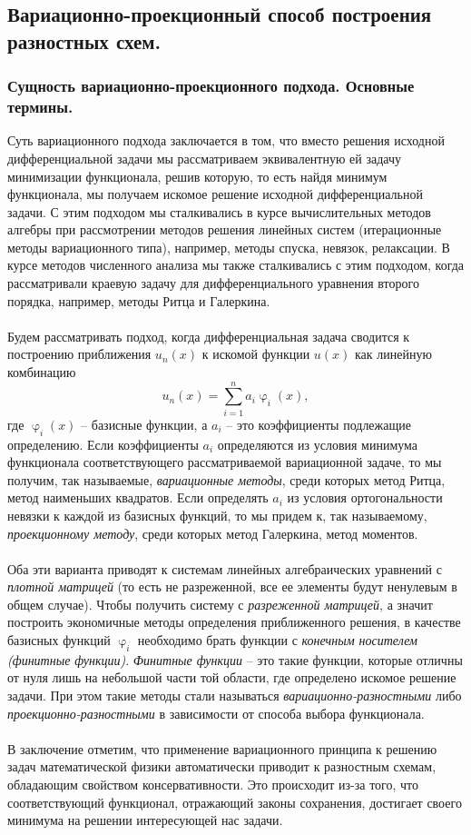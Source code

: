 \documentclass[a4paper, 12pt]{report}
\numberwithin{equation}{section}
\renewcommand{\varphi}{\upvarphi}
\begin{document}
	\subsection{Вариационно-проекционный способ построения разностных схем.}
	\subsubsection{Сущность вариационно-проекционного подхода. Основные термины.}
	Суть вариационного подхода заключается в том, что вместо решения исходной дифференциальной задачи мы рассматриваем эквивалентную ей задачу минимизации функционала, решив которую, то есть найдя минимум функционала, мы получаем искомое решение исходной дифференциальной задачи. С этим подходом мы сталкивались в курсе вычислительных методов алгебры при рассмотрении методов решения линейных систем (итерационные методы вариационного типа), например, методы спуска, невязок, релаксации. В курсе методов численного анализа мы также сталкивались с этим подходом, когда рассматривали краевую задачу для дифференциального уравнения второго порядка, например, методы Ритца и Галеркина.
	\\\\
	Будем рассматривать подход, когда дифференциальная задача сводится к построению приближения $u_n(x)$ к искомой функции $u(x)$ как линейную комбинацию
	$$u_n(x) = \sum_{i=1}^n a_i \varphi_i(x),$$
	где $\varphi_i(x)$ -- базисные функции, а $a_i$ -- это коэффициенты подлежащие определению. Если коэффициенты $a_i$ определяются из условия минимума функционала соответствующего рассматриваемой вариационной задаче, то мы получим, так называемые, \textit{вариационные методы}, среди которых метод Ритца, метод наименьших квадратов. Если определять $a_i$ из условия ортогональности невязки к каждой из базисных функций, то мы придем к, так называемому, \textit{проекционному методу}, среди которых метод Галеркина, метод моментов.\\\\
	Оба эти варианта приводят к системам линейных алгебраических уравнений с \textit{плотной матрицей} (то есть не разреженной, все ее элементы будут ненулевым в общем случае). Чтобы получить систему с \textit{разреженной матрицей}, а значит построить экономичные методы определения приближенного решения, в качестве базисных функций $\varphi_i$ необходимо брать функции с \textit{конечным носителем (финитные функции)}. \textit{Финитные функции} -- это такие функции, которые отличны от нуля лишь на небольшой части той области, где определено искомое решение задачи. При этом такие методы стали называться \textit{вариационно-разностными} либо \textit{проекционно-разностными} в зависимости от способа выбора функционала.
	\\\\
	В заключение отметим, что применение вариационного принципа к решению задач математической физики автоматически приводит к разностным схемам, обладающим свойством консервативности. Это происходит из-за того, что соответствующий функционал, отражающий законы сохранения, достигает своего минимума на решении интересующей нас задачи.
\end{document}
